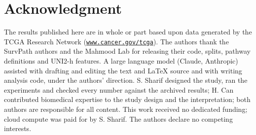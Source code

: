 \documentclass[journal]{IEEEtran}
\newcommand{\weblink}[2]{\href{#1}{\nolinkurl{#2}}}
\begin{document}
\section*{Acknowledgment}
The results published here are in whole or part based upon data generated by the TCGA Research Network (\weblink{https://www.cancer.gov/tcga}{www.cancer.gov/tcga}). The authors thank the SurvPath authors and the Mahmood Lab for releasing their code, splits, pathway definitions and UNI2-h features. A large language model (Claude, Anthropic) assisted with drafting and editing the text and \LaTeX{} source and with writing analysis code, under the authors' direction. S. Sharif designed the study, ran the experiments and checked every number against the archived results; H. Can contributed biomedical expertise to the study design and the interpretation; both authors are responsible for all content. This work received no dedicated funding; cloud compute was paid for by S. Sharif. The authors declare no competing interests.



\end{document}
